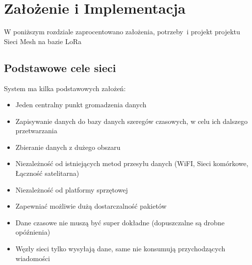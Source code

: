 \chapter{Założenie i Implementacja}
W poniższym rozdziale zaprocentowano założenia, potrzeby~i projekt projektu Sieci Mesh na bazie LoRa

\section{Podstawowe cele sieci}
System ma kilka podstawowych założeń:
\begin{itemize}
    \item Jeden centralny punkt gromadzenia danych
    \item Zapisywanie danych do bazy danych szeregów czasowych, w celu ich dalszego przetwarzania
    \item Zbieranie danych z dużego obszaru
    \item Niezależność od istniejących metod przesyłu danych (WiFI, Sieci komórkowe, Łączność satelitarna)
    \item Niezależność od platformy sprzętowej
    \item Zapewniać możliwie dużą dostarczalność pakietów
    \item Dane czasowe nie muszą być super dokładne (dopuszczalne są drobne opóźnienia)
    \item Węzły sieci tylko wysyłają dane, same nie konsumują przychodzących wiadomości
\end{itemize}

